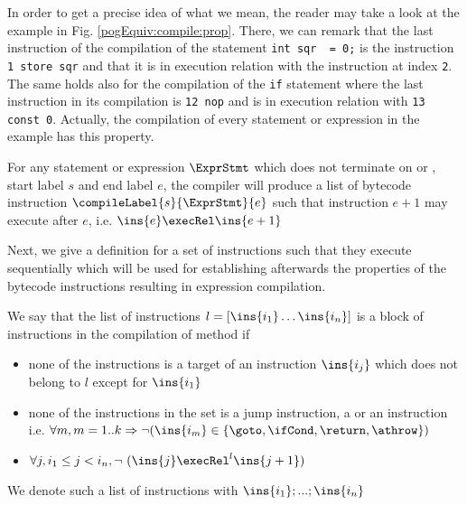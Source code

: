 In order to get a precise idea of what we mean, the reader may take a look at the example in Fig. \ref{pogEquiv:compile:prop}.
There, we can remark that the last instruction of the compilation of the statement \lstinline!int sqr  = 0;! is the instruction \lstinline!1 store sqr! 
and that it is in execution relation with the instruction at index \lstinline!2!. The same holds also for the compilation of the \lstinline!if!
statement where the last instruction  in its compilation is \lstinline!12 nop! and is  in execution relation with \lstinline!13 const 0!.
Actually, the compilation of every statement or expression in the example has this property.

\begin{compProp}\label{compile:prop:compProp0}
 For any statement or expression $\ExprStmt$ which does not terminate on \return or \athrow, start label $s$ and end label $e$,
    the compiler will produce a list of bytecode instruction $\compileLabel{s}{\ExprStmt}{e}$ such that  instruction  $e+1$ may execute after
    $e$, i.e.   $ \ins{e} \execRel \ins{e+1}$
\end{compProp}





 


Next, we give a definition for a set of instructions such that they execute sequentially which will be used for 
establishing afterwards the properties of the bytecode instructions resulting in expression compilation.
 
\begin{seqInstr} \label{seqInstr}
We say that the list of instructions  $l  = \lbrack \ins{i_1} \ldots \ins{i_n} \rbrack$ is a block of instructions
 in the compilation of method \methodd{} if 
 \begin{itemize}
      \item none of the instructions is a target of an instruction $\ins{i_j}$ which does not belong to $l$ except for $\ins{i_1}$
      \item none of the instructions in the set is a jump instruction, a \return{} or an \athrow instruction
            i.e. $\forall m, m = 1..k \Rightarrow \neg( \ins{i_m} \in  \{\goto, \ifCond, \return, \athrow \} )  $ 
      \item $  \forall j, i_1 \le  j < i_n , \neg  \ ( \ins{j} \execRel^{l} \ins{j + 1} ) $ 
 \end{itemize}

We denote such a list of instructions with $\ins{i_1};...;\ins{i_n}$

\end{seqInstr}


